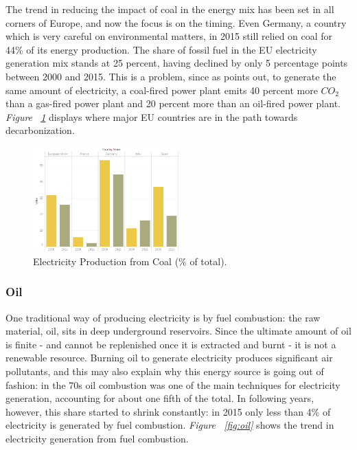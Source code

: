 \documentclass[a4paper,12pt]{book}
\begin{document}
The trend in reducing the impact of coal in the energy mix has been set in all corners of Europe, and now the focus is on the timing. Even Germany, a country which is very careful on environmental matters, in 2015 still relied on coal for 44\% of its energy production. The share of fossil fuel in the EU electricity generation mix stands at 25 percent, having declined by only 5 percentage points between 2000 and 2015. This is a problem, since as \cite{tagliapietra2017beyond} points out, to generate the same amount of electricity, a coal-fired power plant emits 40 percent more $CO_2$ than a gas-fired power plant and 20 percent more than an oil-fired power plant. \textit{Figure ~\ref{fig:coal}} displays where major EU countries are in the path towards decarbonization.

\begin{figure}[tb]
\begin{center}
\captionsetup{justification=centering}
\includegraphics[width=0.5\textwidth]{Images/coal.png}
\caption{Electricity Production from Coal (\% of total). }
\label{fig:coal}
\end{center}
\end{figure}

\subsubsection*{Oil}

One traditional way of producing electricity is by fuel combustion: the raw material, oil, sits in deep underground reservoirs. Since the ultimate amount of oil is finite - and cannot be replenished once it is extracted and burnt - it is not a renewable resource. Burning oil to generate electricity produces significant air pollutants, and this may also explain why this energy source is going out of fashion: in the 70s oil combustion was one of the main techniques for electricity generation, accounting for about one fifth of the total. In following years, however, this share started to shrink constantly: in 2015 only less than 4\% of electricity is generated by fuel combustion. \textit{Figure ~\ref{fig:oil}} shows the trend in electricity generation from fuel combustion.
\end{document}
